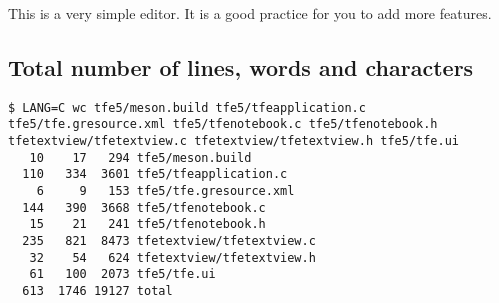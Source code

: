 This is a very simple editor. It is a good practice for you to add more
features.

\subsection{Total number of lines, words and
characters}\label{total-number-of-lines-words-and-characters}

\begin{lstlisting}
$ LANG=C wc tfe5/meson.build tfe5/tfeapplication.c tfe5/tfe.gresource.xml tfe5/tfenotebook.c tfe5/tfenotebook.h tfetextview/tfetextview.c tfetextview/tfetextview.h tfe5/tfe.ui
   10    17   294 tfe5/meson.build
  110   334  3601 tfe5/tfeapplication.c
    6     9   153 tfe5/tfe.gresource.xml
  144   390  3668 tfe5/tfenotebook.c
   15    21   241 tfe5/tfenotebook.h
  235   821  8473 tfetextview/tfetextview.c
   32    54   624 tfetextview/tfetextview.h
   61   100  2073 tfe5/tfe.ui
  613  1746 19127 total
\end{lstlisting}
